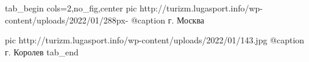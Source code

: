  
 
 
 
 


\ifcmt
  tab_begin cols=2,no_fig,center
     pic http://turizm.lugasport.info/wp-content/uploads/2022/01/288px-%
		 @caption г. Москва

		 pic http://turizm.lugasport.info/wp-content/uploads/2022/01/143.jpg
		 @caption г. Королев
  tab_end
\fi
